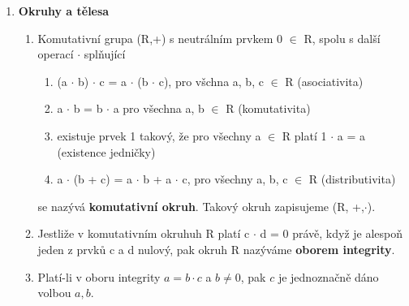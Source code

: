 \documentclass[12pt,a4paper]{article}
\begin{document}
\begin{enumerate}
	\item \textbf{Okruhy a tělesa}
	\begin{enumerate}
		\item Komutativní grupa (R,+) s neutrálním prvkem 0 $\in$ R, spolu s další operací $\cdot$ splňující
		 \begin{enumerate}
		 	\item (a $\cdot$ b) $\cdot$ c = a $\cdot$ (b $\cdot$ c), pro všchna a, b, c $\in$ R (asociativita)
		 	\item a $\cdot$ b = b $\cdot$ a pro všechna a, b $\in$ R (komutativita)
		 	\item existuje prvek 1 takový, že pro všechny a $\in$ R platí 1 $\cdot$ a = a (existence jedničky)
		 	\item a $\cdot$ (b + c) = a $\cdot$ b + a $\cdot$ c, pro všechny a, b, c $\in$ R (distributivita)
		 \end{enumerate}
	 	se nazývá \textbf{komutativní okruh}. Takový okruh zapisujeme (R, +,$\cdot$).
	 	
	 	\item Jestliže v komutativním okruhuh R platí c $\cdot$ d = 0 právě, když je alespoň jeden z prvků c a d nulový, pak okruh R nazýváme \textbf{oborem integrity}.
	 	
	 	\item Platí-li v oboru integrity $a=b\cdot c$ a $b\neq0$, pak $c$ je jednoznačně dáno volbou $a,b$.
	\end{enumerate}
	
	
	
	
	
	
		
		
	\end{enumerate}
	
	
\end{document}
